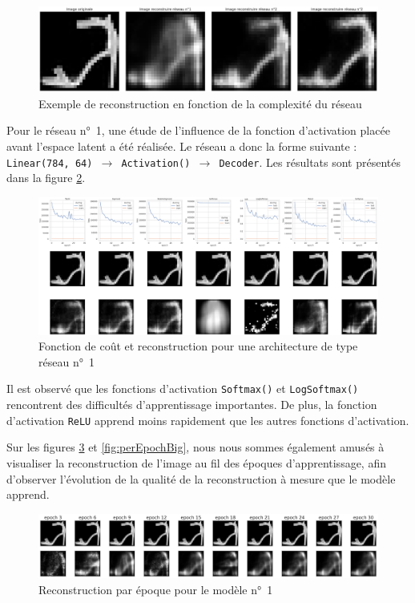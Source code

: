 \documentclass{article}
\begin{document}
\begin{figure}[htbp]
    \centering
    \includegraphics*[width=.75\textwidth]{reconstruction_per_network_cplxity.pdf}
    \caption{Exemple de reconstruction en fonction de la complexité du réseau}
    \label{fig:reconstruction}
\end{figure}

Pour le réseau n°~1, une étude de l'influence de la fonction d'activation placée avant l'espace latent a été réalisée. Le réseau a donc la forme suivante : \texttt{Linear(784, 64) $\rightarrow$ Activation() $\rightarrow$ Decoder}. Les résultats sont présentés dans la figure \ref{fig:accfct}. 

\begin{figure}[htbp]
    \centering
    \includegraphics*[width=\textwidth]{encoder_decoder_middle_func_simple_net.pdf}
    \caption{Fonction de coût et reconstruction pour une architecture de type réseau n°~1}
    \label{fig:accfct}
\end{figure}

Il est observé que les fonctions d'activation \texttt{Softmax()} et \texttt{LogSoftmax()} rencontrent des difficultés d'apprentissage importantes. De plus, la fonction d'activation \texttt{ReLU} apprend moins rapidement que les autres fonctions d'activation.

Sur les figures \ref{fig:perEpochSimple} et \ref{fig:perEpochBig}, nous nous sommes également amusés à visualiser la reconstruction de l'image au fil des époques d'apprentissage, afin d'observer l'évolution de la qualité de la reconstruction à mesure que le modèle apprend.

\begin{figure}[htbp]
    \centering
    \includegraphics*[width=\textwidth]{reconstruction_per_epoch_simple_model.pdf}
    \caption{Reconstruction par époque pour le modèle n°~1}
    \label{fig:perEpochSimple}
\end{figure}
\end{document}
